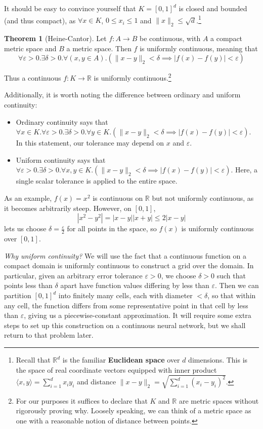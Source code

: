\documentclass{article}
\theoremstyle{definition}
\newtheorem{theorem}{Theorem}
\begin{document}
It should be easy to convince yourself that $K = [0, 1]^d$ is closed and bounded (and thus compact), as $\forall x \in K$, $0 \le x_i \le 1$ and $\|x\|_2 \le \sqrt{d}$.\footnote{
Recall that $\mathbb{R}^d$ is the familiar \textbf{Euclidean space} over $d$ dimensions. This is the space of real coordinate vectors equipped with inner product $\langle x, y \rangle = \sum^{d}_{i=1} x_iy_i$ and distance $\|x - y\|_2 = \sqrt{\sum^{d}_{i=1} (x_i - y_i)^2}$.}

\begin{theorem}[Heine-Cantor] Let $f: A \to B$ be continuous, with $A$ a compact metric space and $B$ a metric space. Then $f$ is uniformly continuous, meaning that
$$\forall \varepsilon > 0.\exists \delta > 0.\forall(x, y \in A).(\|x-y\|_2 < \delta \implies |f(x)-f(y)| < \varepsilon)$$
\end{theorem}

Thus a continuous $f : K \to \mathbb{R}$ is uniformly continuous.\footnote{For our purposes it suffices to declare that $K$ and $\mathbb{R}$ are metric spaces without rigorously proving why. Loosely speaking, we can think of a metric space as one with a reasonable notion of distance between points.}

Additionally, it is worth noting the difference between ordinary and uniform continuity:
\begin{itemize}
    \item Ordinary continuity says that $\forall x \in K.\forall \varepsilon > 0.\exists \delta > 0.\forall y \in K.(\|x - y\|_2 < \delta \implies |f(x) - f(y)| < \varepsilon)$. In this statement, our tolerance may depend on $x$ and $\varepsilon$.
    \item Uniform continuity says that $\forall \varepsilon > 0.\exists \delta > 0.\forall x, y \in K.(\|x - y\|_2 < \delta \implies |f(x) - f(y)| < \varepsilon)$. Here, a single scalar tolerance is applied to the entire space.
\end{itemize}
As an example, $f(x)=x^2$ is continuous on $\mathbb{R}$ but not uniformly continuous, as it becomes arbitrarily steep. However, on $[0, 1]$,
$$|x^2 - y^2| = |x-y||x+y| \le 2|x-y|$$
lets us choose $\delta = \frac{\varepsilon}{2}$ for all points in the space, so $f(x)$ is uniformly continuous over $[0, 1]$.

\begin{aside}
\textit{Why uniform continuity?} We will use the fact that a continuous function on a compact domain is uniformly continuous to construct a grid over the domain. In particular, given an arbitrary error tolerance $\varepsilon > 0$, we choose $\delta > 0$ such that points less than $\delta$ apart have function values differing by less than $\varepsilon$. Then we can partition $[0, 1]^d$ into finitely many cells, each with diameter $< \delta$, so that within any cell, the function differs from some representative point in that cell by less than $\varepsilon$, giving us a piecewise-constant approximation. It will require some extra steps to set up this construction on a continuous neural network, but we shall return to that problem later.
\end{aside}
\end{document}
